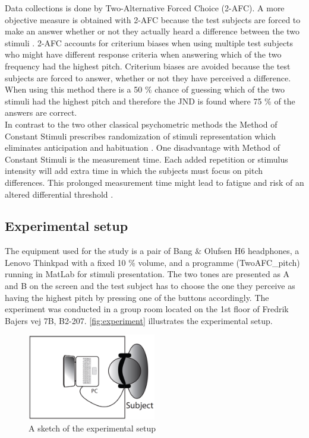 Data collections is done by Two-Alternative Forced Choice (2-AFC). A more objective measure is obtained with 2-AFC because the test subjects are forced to make an answer whether or not they actually heard a difference between the two stimuli \citep[p. 1219]{Ehrenstein1999}. 2-AFC accounts for criterium biases when using multiple test subjects who might have different response criteria when answering which of the two frequency had the highest pitch. Criterium biases are avoided because the test subjects are forced to answer,  whether or not they have perceived a difference. When using this method there is a 50 \% chance of guessing which of the two stimuli had the highest pitch and therefore the JND is found where 75 \% of the answers are correct.\\[5mm]
%
In contrast to the two other classical psychometric methods the Method of Constant Stimuli prescribes randomization of stimuli representation which eliminates anticipation and habituation \citep[p. 15]{Poulsen2005}. One disadvantage with Method of Constant Stimuli is the measurement time. Each added repetition or stimulus intensity will add extra time in which the subjects must focus on pitch differences. This prolonged measurement time might lead to fatigue and risk of an altered differential threshold \citep[p. 16]{Poulsen2005}. 
%

\subsection*{Experimental setup}
%
The equipment used for the study is a pair of Bang $\&$ Olufsen H6 headphones, a Lenovo Thinkpad with a fixed 10 \% volume, and a programme (TwoAFC\_pitch) running in MatLab for stimuli presentation. The two tones are presented as A and B on the screen and the test subject has to choose the one they perceive as having the highest pitch by pressing one of the buttons accordingly. The experiment was conducted in a group room located on the 1st floor of Fredrik Bajers vej 7B, B2-207. \autoref{fig:experiment} illustrates the experimental setup.
%
\begin{figure}[H]
\centering
\includegraphics[width = 0.5\textwidth]{Figure/Vores_Figurer/experiment.png} 
\caption{A sketch of the experimental setup}
\label{fig:experiment}
\end{figure}
%


